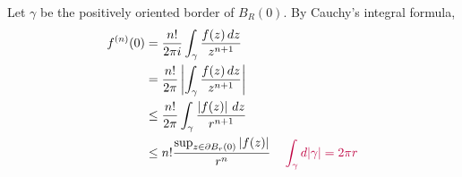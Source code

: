 \documentclass{homework}
\begin{document}
                                                                                                                                                                              \begin{solution}
                                                                                                                                                                              Let $\gamma$ be the positively oriented border of $B_R(0)$.
                                                                                                                                                                              By Cauchy's integral formula,
                                                                                                                                                                              \begin{align*}
                                                                                                                                                                              f^{(n)}(0) &= \frac{n!}{2\pi i}\int_{\gamma} \frac{f(z)\, dz}{z^{n+1}}\\
                                                                                                                                                                              &= \frac{n!}{2\pi}\left|\int_{\gamma} \frac{f(z)\, dz}{z^{n+1}}\right|\\
                                                                                                                                                                              &\leq \frac{n!}{2\pi}\int_{\gamma} \frac{\left|f(z)\right|\, dz}{r^{n+1}}\\
                                                                                                                                                                              &\leq n!\frac{\sup_{z\in\partial B_r(0)} \left|f(z)\right|}{r^{n}}\quad \color{purple} \int_\gamma d|\gamma| = 2\pi r
                                                                                                                                                                              \end{align*}


\end{solution}
\end{document}
